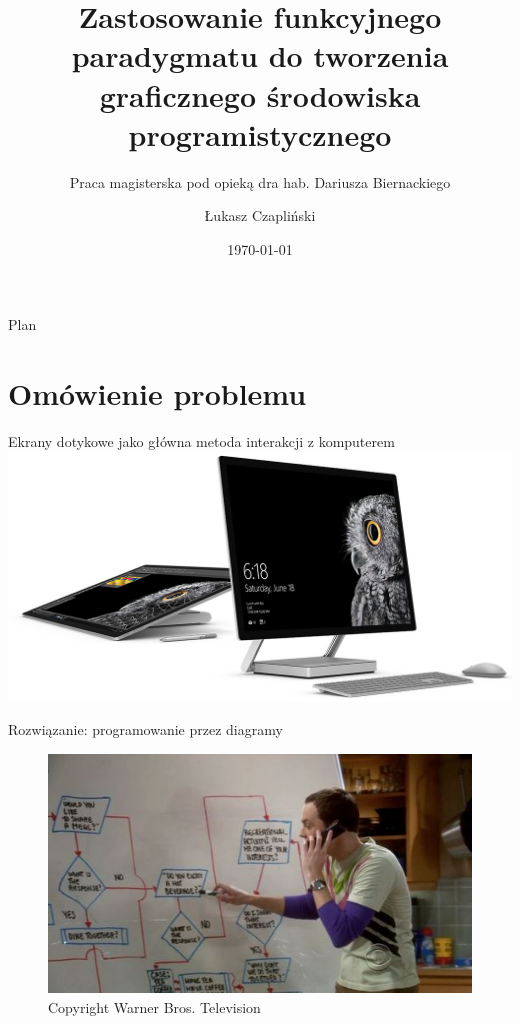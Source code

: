 \documentclass[presentation]{beamer}
\institute{Wydział Matematyki i Informatyki UWr}\subtitle{Praca magisterska pod opieką dra hab. Dariusza Biernackiego}
\author{Łukasz Czapliński}
\date{\today}
\title{Zastosowanie funkcyjnego paradygmatu do tworzenia graficznego środowiska programistycznego}
\begin{document}
\maketitle
\begin{frame}{Plan}
\tableofcontents
\end{frame}

\section{Omówienie problemu}
\label{sec-1}
\begin{frame}[label=sec-1-1]{Ekrany dotykowe jako główna metoda interakcji z komputerem}
\includegraphics[width=.9\linewidth]{./img/studio.png}
\end{frame}
\begin{frame}[label=sec-1-2]{Rozwiązanie: programowanie przez diagramy}
\begin{figure}[htb]
\centering
\includegraphics[width=.9\linewidth]{./img/whiteboard.jpg}
\caption{\small{Copyright Warner Bros. Television}}
\end{figure}
\end{frame}
\end{document}
